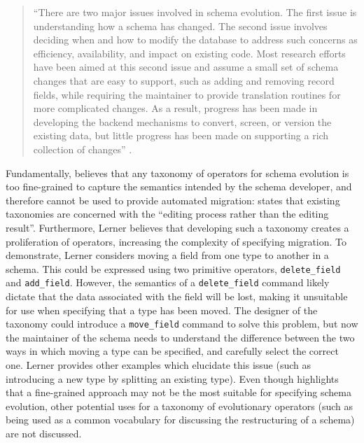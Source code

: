  \begin{quote}
 ``There are two major issues involved in schema evolution. The first issue is understanding how a schema has changed. The second issue involves deciding when and how to modify the database to address such concerns as efficiency, availability, and impact on existing code. Most research efforts have been aimed at this second issue and assume a small set of schema changes that are easy to support, such as adding and removing record fields, while requiring the maintainer to provide translation routines for more complicated changes. As a result, progress has been made in developing the backend mechanisms to convert, screen, or version the existing data, but little progress has been made on supporting a rich collection of changes'' \cite[pg. 84]{lerner00model}.
 \end{quote}

Fundamentally, \cite{lerner00model} believes that any taxonomy of operators for schema evolution is too fine-grained to capture the semantics intended by the schema developer, and therefore cannot be used to provide automated migration: \cite{lerner00model} states that existing taxonomies are concerned with the ``editing process rather than the editing result''. Furthermore, Lerner believes that developing such a taxonomy creates a proliferation of operators, increasing the complexity of specifying migration. To demonstrate, Lerner  considers moving a field from one type to another in a schema. This could be expressed using two primitive operators, \verb|delete_field| and \verb|add_field|. However, the semantics of a \verb|delete_field| command likely dictate that the data associated with the field will be lost, making it unsuitable for use when specifying that a type has been moved. The designer of the taxonomy could introduce a \verb|move_field| command to solve this problem, but now the maintainer of the schema needs to understand the difference between the two ways in which moving a type can be specified, and carefully select the correct one. Lerner provides other examples which elucidate this issue (such as introducing a new type by splitting an existing type). Even though \cite{lerner00model} highlights that a fine-grained approach may not be the most suitable for specifying schema evolution,  other potential uses for a taxonomy of evolutionary operators (such as being used as a common vocabulary for discussing the restructuring of a schema) are not discussed.


